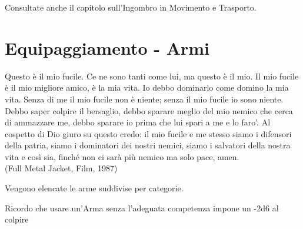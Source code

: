 \documentclass[a4paper,11pt,twoside,openany]{book}
\begin{document}
\medskip

Consultate anche il capitolo sull'Ingombro in Movimento e Trasporto.

\pagebreak

\section{Equipaggiamento - Armi}

\label{equipaggiamento---armi}
\begin{tcolorbox}[enhanced,arc=5pt,boxrule=0.3pt]{
		Questo è il mio fucile. Ce ne sono tanti come lui, ma questo è il mio. Il mio fucile è il mio migliore amico, è la mia vita. Io debbo dominarlo come domino la mia vita. Senza di me il mio fucile non è niente; senza il mio fucile io sono niente. Debbo saper colpire il bersaglio, debbo sparare meglio del mio nemico che cerca di ammazzare me, debbo sparare io prima che lui spari a me e lo faro'. Al cospetto di Dio giuro su questo credo: il mio fucile e me stesso siamo i difensori della patria, siamo i dominatori dei nostri nemici, siamo i salvatori della nostra vita e così sia, finché non ci sarà più nemico ma solo pace, amen.
		\\
		(Full Metal Jacket, Film, 1987)}\end{tcolorbox}\medskip

Vengono elencate le arme suddivise per categorie.

Ricordo che usare un'Arma senza l'adeguata competenza impone un -2d6 al colpire
\end{document}

